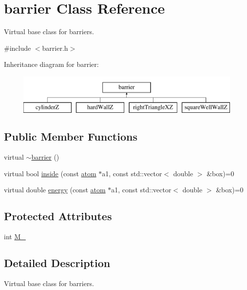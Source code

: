 \hypertarget{classbarrier}{\section{barrier Class Reference}
\label{classbarrier}
}


Virtual base class for barriers.  




{\ttfamily \#include $<$barrier.\-h$>$}

Inheritance diagram for barrier\-:\begin{figure}[H]
\begin{center}
\leavevmode
\includegraphics[height=2.000000cm]{classbarrier}
\end{center}
\end{figure}
\subsection*{Public Member Functions}
\begin{DoxyCompactItemize}
\item 
virtual \hyperlink{classbarrier_a54d34bd0e56a4af26ab34975e9569ac7}{$\sim$barrier} ()
\item 
virtual bool \hyperlink{classbarrier_a948ebdcfac501cb75d1a1f045a7d9125}{inside} (const \hyperlink{classatom}{atom} $\ast$a1, const std\-::vector$<$ double $>$ \&box)=0
\item 
virtual double \hyperlink{classbarrier_a2d308cfd5709aa479d0b37733f1a0db7}{energy} (const \hyperlink{classatom}{atom} $\ast$a1, const std\-::vector$<$ double $>$ \&box)=0
\end{DoxyCompactItemize}
\subsection*{Protected Attributes}
\begin{DoxyCompactItemize}
\item 
int \hyperlink{classbarrier_a274cf283ffc97c22ffa9a4258369c400}{M\-\_\-}
\end{DoxyCompactItemize}


\subsection{Detailed Description}
Virtual base class for barriers. 

